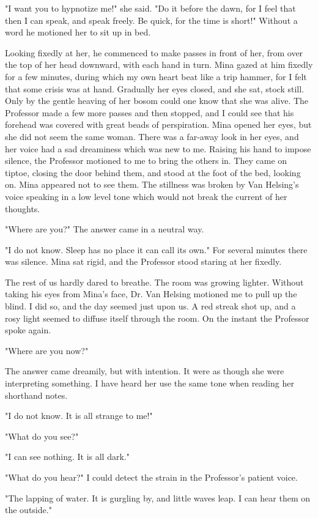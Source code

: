"I want you to hypnotize me!" she said. "Do it before the dawn, for I feel that then I can speak, and speak freely. Be quick, for the time is short!" Without a word he motioned her to sit up in bed. 

Looking fixedly at her, he commenced to make passes in front of her, from over the top of her head downward, with each hand in turn. Mina gazed at him fixedly for a few minutes, during which my own heart beat like a trip hammer, for I felt that some crisis was at hand. Gradually her eyes closed, and she sat, stock still. Only by the gentle heaving of her bosom could one know that she was alive. The Professor made a few more passes and then stopped, and I could see that his forehead was covered with great beads of perspiration. Mina opened her eyes, but she did not seem the same woman. There was a far-away look in her eyes, and her voice had a sad dreaminess which was new to me. Raising his hand to impose silence, the Professor motioned to me to bring the others in. They came on tiptoe, closing the door behind them, and stood at the foot of the bed, looking on. Mina appeared not to see them. The stillness was broken by Van Helsing's voice speaking in a low level tone which would not break the current of her thoughts. 

"Where are you?" The answer came in a neutral way. 

"I do not know. Sleep has no place it can call its own." For several minutes there was silence. Mina sat rigid, and the Professor stood staring at her fixedly. 

The rest of us hardly dared to breathe. The room was growing lighter. Without taking his eyes from Mina's face, Dr. Van Helsing motioned me to pull up the blind. I did so, and the day seemed just upon us. A red streak shot up, and a rosy light seemed to diffuse itself through the room. On the instant the Professor spoke again. 

"Where are you now?" 

The answer came dreamily, but with intention. It were as though she were interpreting something. I have heard her use the same tone when reading her shorthand notes. 

"I do not know. It is all strange to me!" 

"What do you see?" 

"I can see nothing. It is all dark." 

"What do you hear?" I could detect the strain in the Professor's patient voice. 

"The lapping of water. It is gurgling by, and little waves leap. I can hear them on the outside." 

